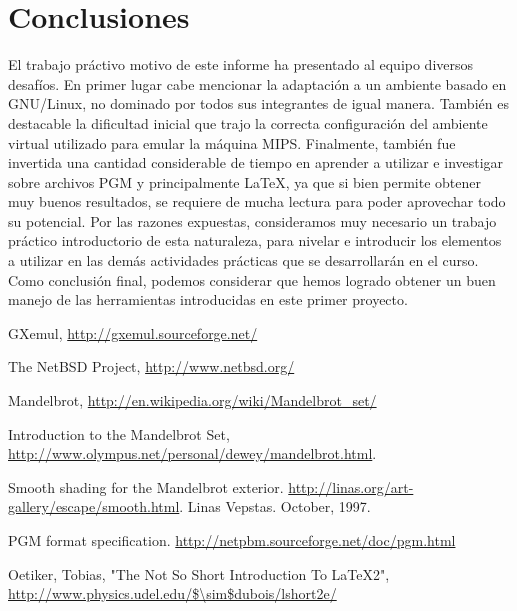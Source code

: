 \documentclass[a4paper,10pt]{article}
\begin{document}
\pagebreak



\section{Conclusiones}
El trabajo pr\'activo motivo de este informe ha presentado al equipo diversos desaf\'ios. En primer lugar cabe mencionar la adaptaci\'on a un ambiente basado en GNU/Linux, no dominado por todos sus integrantes de igual manera. Tambi\'en es destacable la dificultad inicial que trajo la correcta configuraci\'on del ambiente virtual utilizado para emular la m\'aquina MIPS. Finalmente, tambi\'en fue invertida una cantidad considerable de tiempo en aprender a utilizar e investigar sobre archivos PGM y principalmente \LaTeX{}, ya que si bien permite obtener muy buenos resultados, se requiere de mucha lectura para poder aprovechar todo su potencial.
Por las razones expuestas, consideramos muy necesario un trabajo pr\'actico introductorio de esta naturaleza, para nivelar e introducir los elementos a utilizar en las dem\'as actividades pr\'acticas que se desarrollar\'an en el curso.\\
Como conclusi\'on final, podemos considerar que hemos logrado obtener un buen manejo de las herramientas introducidas en este primer proyecto.

\pagebreak

\begin{thebibliography}{99}

 GXemul, \url{http://gxemul.sourceforge.net/}

 The NetBSD Project, \url{http://www.netbsd.org/}

 Mandelbrot, \url{http://en.wikipedia.org/wiki/Mandelbrot\_set/}

 Introduction to the Mandelbrot Set,
\url{http://www.olympus.net/personal/dewey/mandelbrot.html}.

 Smooth shading for the Mandelbrot exterior.
\url{http://linas.org/art-gallery/escape/smooth.html}. Linas Vepstas. October, 1997.

 PGM format specification.
\url{http://netpbm.sourceforge.net/doc/pgm.html}

 Oetiker, Tobias, "The Not So Short Introduction To LaTeX2", \url{http://www.physics.udel.edu/$\sim$dubois/lshort2e/}

\end{thebibliography}
\end{document}
